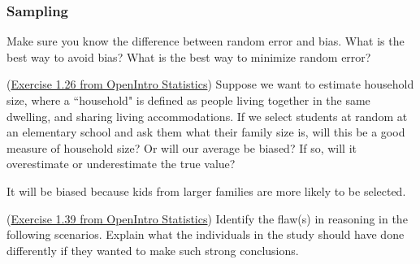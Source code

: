 \documentclass[12pt,answers]{exam}
\newcounter{countA}
\begin{document}
\subsubsection*{Sampling}\label{sampling}

Make sure you know the difference between random error and bias. What is the best way to avoid bias?  What is the best way to minimize random error? 

\begin{questions}
\setcounter{question}{\value{countA}}
\question (\href{http://people.hsc.edu/faculty-staff/blins/books/OpenIntroStats4e.pdf\#eoce.1.26}{Exercise 1.26 from OpenIntro Statistics}) Suppose we want to estimate household size, where a ``household" is defined as people
living together in the same dwelling, and sharing living accommodations. If we select students at random
at an elementary school and ask them what their family size is, will this be a good measure of household
size? Or will our average be biased? If so, will it overestimate or underestimate the true value?
\begin{solution}
It will be biased because kids from larger families are more likely to be selected.  
\end{solution}
\bigskip

\question (\href{http://people.hsc.edu/faculty-staff/blins/books/OpenIntroStats4e.pdf\#eoce.1.39}{Exercise 1.39 from OpenIntro Statistics}) Identify the flaw(s) in reasoning in the following scenarios. Explain what the
individuals in the study should have done differently if they wanted to make such strong conclusions.
\end{questions}
\end{document}
